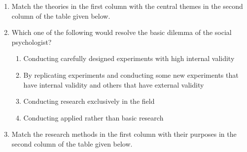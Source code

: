 \documentclass[12pt]{article}
\theoremstyle{remark}
\begin{document}
\begin{enumerate}
\begin{enumerate}
 \end{enumerate}
\hfill{}
\item Match the theories in the first column with the central themes in the second column of the table given below.
\begin{table}[H]
    \centering
    
       \caption{}
    \label{tab:5.5}
\end{table}
\begin{enumerate}  \end{enumerate}
\hfill{}
\item Which one of the following would resolve the basic dilemma of the social psychologist?
\begin{enumerate}
    \item Conducting carefully designed experiments with high internal validity
    \item By replicating experiments and conducting some new experiments that have internal validity and others that have external validity
    \item Conducting research exclusively in the field
    \item Conducting applied rather than basic research
\end{enumerate}
\hfill{}
\item Match the research methods in the first column with their purposes in the second column of the table given below.
\begin{table}[H]
    \centering
    
    \caption{}
    \label{table:5.6}
\end{table}
\begin{enumerate} 
\end{enumerate}
\end{enumerate}
\end{document}
